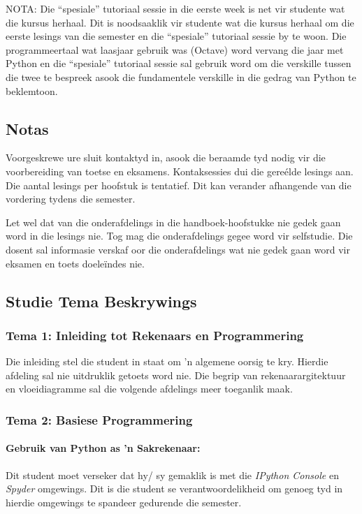 	NOTA:  Die ``spesiale'' tutoriaal sessie in die eerste week is net 
	vir studente wat die kursus herhaal. Dit is noodsaaklik vir studente
	wat die kursus herhaal om die eerste lesings van die semester en die
	``spesiale'' tutoriaal sessie by te woon.  Die programmeertaal wat 
	laasjaar gebruik was (Octave) word vervang die jaar met Python en die
	``spesiale'' tutoriaal sessie sal gebruik word om die verskille tussen 
	die twee te bespreek asook die fundamentele verskille in die gedrag van Python 
	te beklemtoon.
        
    \subsection{Notas}
	Voorgeskrewe ure sluit kontaktyd in, asook die beraamde tyd nodig vir die
	voorbereiding van toetse en eksamens.  Kontaksessies dui die 
	gere\'{e}lde lesings aan.  Die aantal lesings per hoofstuk is tentatief.  Dit
	kan verander afhangende van die vordering tydens die semester.
        
	Let wel dat van die onderafdelings in die handboek-hoofstukke nie
	gedek gaan word in die lesings nie. Tog mag die onderafdelings gegee
	word vir selfstudie.  Die dosent sal informasie verskaf oor die 
	onderafdelings wat nie gedek gaan word vir eksamen en toets doele\"{i}ndes nie.
    
    \subsection{Studie Tema Beskrywings}
        \subsubsection{Tema 1: Inleiding tot Rekenaars en Programmering}
	    Die inleiding stel die student in staat om 'n algemene oorsig te kry.
	    Hierdie afdeling sal nie uitdruklik getoets word nie.  Die begrip
	    van rekenaarargitektuur en vloeidiagramme sal die volgende afdelings
	    meer toeganlik maak.
            
        \subsubsection{Tema 2: Basiese Programmering}
            \paragraph{Gebruik van Python as 'n Sakrekenaar:}
		 Dit student moet verseker dat hy/ sy gemaklik is met die 
		 \emph{IPython Console} en \emph{Spyder} omgewings.  Dit is die 
		 student se verantwoordelikheid om genoeg tyd in hierdie omgewings
		 te spandeer gedurende die semester.
